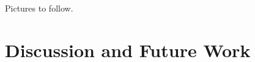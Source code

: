\documentclass{article}
\begin{document}
Pictures to follow.

\section{Discussion and Future Work}


\begin{comment}
The main limitation of my current implementation of camera localisation is the use of the findChessboardCorners function to locate the relevant features in an image. This function is subject to the limitation that the whole chessboard pattern must be in view of the camera or none of the internal corners' image-space coordinates are given. Without those image-space coordinates the pose estimation algorithm cannot be executed and therefore the camera's location cannot be determined. This effectively limits the puzzle to being played on a tabletop without anyone obscuring the board from another player's iPad, which is at odds with our vision of how the game should be played.

It would be nice to develop a marker tracking system that doesn't require that the whole marker (or all markers) be in view at one time, and if at all possible allow for a marker to be partially obscured without loss of camera location. There has been some research on the topic of partial marker occlusion \cite{occlusion} and I would like to be able to implement a similar system. 
\end{comment}



\nocite{*}


\end{document}
